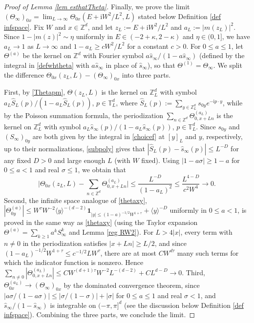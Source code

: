 \documentclass{article}
\newcommand{\1}{\mathds{1}}
\numberwithin{equation}{section}
\newcommand{\wh}{\widehat}
\newcommand{\ii}{\mathrm{i}} %
\renewcommand{\leq}{\leqslant}
\renewcommand{\geq}{\geqslant}
\renewcommand{\le}{\leq}
\renewcommand{\ge}{\geq}
\newcommand{\Z}{\mathbb{Z}}
\theoremstyle{plain} %
\theoremstyle{remark}
\begin{document}
\begin{proof}[Proof of Lemma \ref{lem esthatTheta}]
Finally, we prove the limit $(\Theta_\infty)_{0x}=\lim_{L\to\infty}\Theta_{0x}(E+\ii W^2/L^2,L)$ stated below Definition \ref{def infspace}. Fix $W$ and $x\in\Z^d$, and let $z_L:=E+\ii W^2/L^2$ and $a_L:=|m(z_L)|^2$. Since $1-|m(z)|^2\sim \eta$ uniformly in $E\in(-2+\kappa,2-\kappa)$ and $\eta\in(0,1]$, we have $a_L\to 1$ as $L\to\infty$ and $1-a_L\ge cW^2/L^2$ for a constant $c>0$. For $0\le a\le 1$, let $\Theta^{(a)}$ be the kernel on $\Z^d$ with Fourier symbol $a\wh s_\infty/(1-a\wh s_\infty)$ (defined by the integral in \eqref{defwhtheta} with $a\wh s_\infty$ in place of $\wh s_\infty$), so that $\Theta^{(1)}=\Theta_\infty$. We split the difference $\Theta_{0x}(z_L,L)-(\Theta_\infty)_{0x}$ into three parts. 

First, by \eqref{Thetapm}, $\Theta(z_L,L)$ is the kernel on $\Z_L^d$ with symbol $a_L\wh S_{L}(p)/(1-a_L\wh S_{L}(p))$, $p\in \mathbb T_L^d$, where $\wh S_L(p):=\sum_{y\in\Z_L^d}s_{0y}e^{-\ii p\cdot y}$, while by the Poisson summation formula, the periodization $\sum_{n\in\Z^d}\Theta^{(a_L)}_{0,x+Ln}$ is the kernel on $\Z_L^d$ with symbol $a_L\wh s_\infty(p)/(1-a_L\wh s_\infty(p))$, $p\in \mathbb T_L^d$. Since $s_{0y}$ and $(S_\infty)_{0y}$ are both given by the integral in \eqref{choicef} at $[y]_L$ and $y$, respectively, up to their normalizations, \eqref{subpoly} gives that $|\wh S_L(p)-\wh s_\infty(p)|\le L^{-D}$ for any fixed $D>0$ and large enough $L$ (with $W$ fixed). Using $|1-a\sigma|\ge 1-a$ for $0\le a<1$ and real $\sigma\le 1$, we obtain that 
$$\Big|\Theta_{0x}(z_L,L)-\sum_{n\in\Z^d}\Theta^{(a_L)}_{0,x+Ln}\Big|\le \frac{L^{-D}}{(1-a_L)^2}\le \frac{L^{4-D}}{c^2W^4}\to 0.$$
Second, the infinite space analogue of \eqref{thetaxy}, $|\Theta^{(a)}_{0y}|\le W^{\tau}W^{-2}\langle y\rangle^{-(d-2)}\mathbf 1_{|y|\le (1-a)^{-1/2}W^{1+\tau}}+\langle y\rangle^{-D}$ uniformly in $0\le a<1$, is proved in the same way as \eqref{thetaxy} (using the Taylor expansion $\Theta^{(a)}=\sum_{k\ge 1}a^kS_\infty^k$ and Lemma \ref{reg RW2}). For $L>4|x|$, every term with $n\ne 0$ in the periodization satisfies $|x+Ln|\ge L/2$, and since $(1-a_L)^{-1/2}W^{1+\tau}\le c^{-1/2}LW^{\tau}$, there are at most $CW^{d\tau}$ many such terms for which the indicator function is nonzero. Hence $\sum_{n\ne 0}|\Theta^{(a_L)}_{0,x+Ln}|\le CW^{(d+1)\tau}W^{-2}L^{-(d-2)}+CL^{d-D}\to 0$. 
Third, $\Theta^{(a_L)}_{0x}\to (\Theta_\infty)_{0x}$ by the dominated convergence theorem, since $|a\sigma/(1-a\sigma)|\le |\sigma/(1-\sigma)|+|\sigma|$ for $0\le a\le 1$ and real $\sigma<1$, and $\wh s_\infty/(1-\wh s_\infty)$ is integrable on $(-\pi,\pi]^d$ (see the discussion below Definition \ref{def infspace}). 
Combining the three parts, we conclude the limit.
\end{proof}
\end{document}
